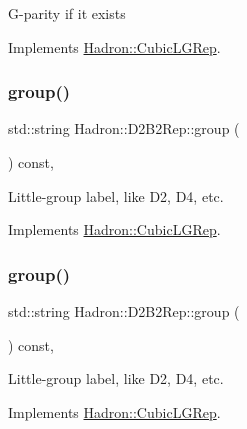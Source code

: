 G-\/parity if it exists 

Implements \mbox{\hyperlink{structHadron_1_1CubicLGRep_ace26f7b2d55e3a668a14cb9026da5231}{Hadron\+::\+Cubic\+L\+G\+Rep}}.

\mbox{\label{structHadron_1_1D2B2Rep_a9fb4cee66698b4d18b47ed2f4aa9ff2f}} 
\subsubsection{\texorpdfstring{group()}{group()}\hspace{0.1cm}{\footnotesize\ttfamily [1/3]}}
{\footnotesize\ttfamily std\+::string Hadron\+::\+D2\+B2\+Rep\+::group (\begin{DoxyParamCaption}{ }\end{DoxyParamCaption}) const\hspace{0.3cm}{\ttfamily [inline]}, {\ttfamily [virtual]}}

Little-\/group label, like D2, D4, etc. 

Implements \mbox{\hyperlink{structHadron_1_1CubicLGRep_a9bdb14b519a611d21379ed96a3a9eb41}{Hadron\+::\+Cubic\+L\+G\+Rep}}.

\mbox{\label{structHadron_1_1D2B2Rep_a9fb4cee66698b4d18b47ed2f4aa9ff2f}} 
\subsubsection{\texorpdfstring{group()}{group()}\hspace{0.1cm}{\footnotesize\ttfamily [2/3]}}
{\footnotesize\ttfamily std\+::string Hadron\+::\+D2\+B2\+Rep\+::group (\begin{DoxyParamCaption}{ }\end{DoxyParamCaption}) const\hspace{0.3cm}{\ttfamily [inline]}, {\ttfamily [virtual]}}

Little-\/group label, like D2, D4, etc. 

Implements \mbox{\hyperlink{structHadron_1_1CubicLGRep_a9bdb14b519a611d21379ed96a3a9eb41}{Hadron\+::\+Cubic\+L\+G\+Rep}}.

\mbox{\label{structHadron_1_1D2B2Rep_a9fb4cee66698b4d18b47ed2f4aa9ff2f}} 
